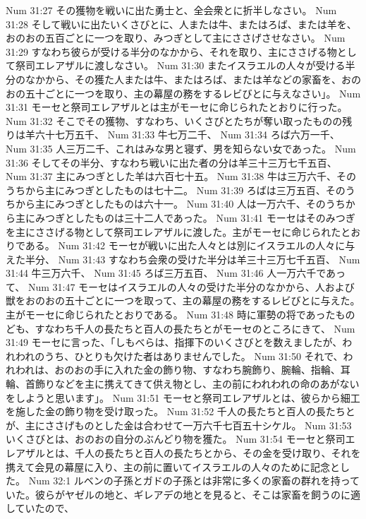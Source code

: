 Num 31:27  その獲物を戦いに出た勇士と、全会衆とに折半しなさい。
Num 31:28  そして戦いに出たいくさびとに、人または牛、またはろば、または羊を、おのおの五百ごとに一つを取り、みつぎとして主にささげさせなさい。
Num 31:29  すなわち彼らが受ける半分のなかから、それを取り、主にささげる物として祭司エレアザルに渡しなさい。
Num 31:30  またイスラエルの人々が受ける半分のなかから、その獲た人または牛、またはろば、または羊などの家畜を、おのおの五十ごとに一つを取り、主の幕屋の務をするレビびとに与えなさい」。
Num 31:31  モーセと祭司エレアザルとは主がモーセに命じられたとおりに行った。
Num 31:32  そこでその獲物、すなわち、いくさびとたちが奪い取ったものの残りは羊六十七万五千、
Num 31:33  牛七万二千、
Num 31:34  ろば六万一千、
Num 31:35  人三万二千、これはみな男と寝ず、男を知らない女であった。
Num 31:36  そしてその半分、すなわち戦いに出た者の分は羊三十三万七千五百、
Num 31:37  主にみつぎとした羊は六百七十五。
Num 31:38  牛は三万六千、そのうちから主にみつぎとしたものは七十二。
Num 31:39  ろばは三万五百、そのうちから主にみつぎとしたものは六十一。
Num 31:40  人は一万六千、そのうちから主にみつぎとしたものは三十二人であった。
Num 31:41  モーセはそのみつぎを主にささげる物として祭司エレアザルに渡した。主がモーセに命じられたとおりである。
Num 31:42  モーセが戦いに出た人々とは別にイスラエルの人々に与えた半分、
Num 31:43  すなわち会衆の受けた半分は羊三十三万七千五百、
Num 31:44  牛三万六千、
Num 31:45  ろば三万五百、
Num 31:46  人一万六千であって、
Num 31:47  モーセはイスラエルの人々の受けた半分のなかから、人および獣をおのおの五十ごとに一つを取って、主の幕屋の務をするレビびとに与えた。主がモーセに命じられたとおりである。
Num 31:48  時に軍勢の将であったものども、すなわち千人の長たちと百人の長たちとがモーセのところにきて、
Num 31:49  モーセに言った、「しもべらは、指揮下のいくさびとを数えましたが、われわれのうち、ひとりも欠けた者はありませんでした。
Num 31:50  それで、われわれは、おのおの手に入れた金の飾り物、すなわち腕飾り、腕輪、指輪、耳輪、首飾りなどを主に携えてきて供え物とし、主の前にわれわれの命のあがないをしようと思います」。
Num 31:51  モーセと祭司エレアザルとは、彼らから細工を施した金の飾り物を受け取った。
Num 31:52  千人の長たちと百人の長たちとが、主にささげものとした金は合わせて一万六千七百五十シケル。
Num 31:53  いくさびとは、おのおの自分のぶんどり物を獲た。
Num 31:54  モーセと祭司エレアザルとは、千人の長たちと百人の長たちとから、その金を受け取り、それを携えて会見の幕屋に入り、主の前に置いてイスラエルの人々のために記念とした。
Num 32:1  ルベンの子孫とガドの子孫とは非常に多くの家畜の群れを持っていた。彼らがヤゼルの地と、ギレアデの地とを見ると、そこは家畜を飼うのに適していたので、

